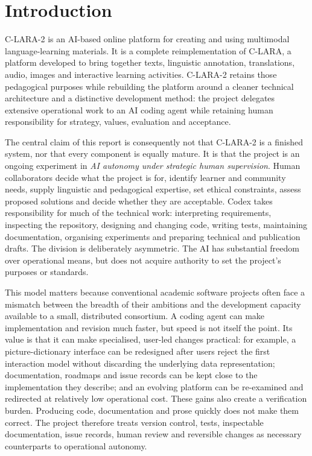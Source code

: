 \section{Introduction}

C-LARA-2 is an AI-based online platform for creating and using multimodal
language-learning materials. It is a complete reimplementation of C-LARA, a
platform developed to bring together texts, linguistic annotation,
translations, audio, images and interactive learning activities. C-LARA-2
retains those pedagogical purposes while rebuilding the platform around a
cleaner technical architecture and a distinctive development method: the
project delegates extensive operational work to an AI coding agent while
retaining human responsibility for strategy, values, evaluation and
acceptance.

The central claim of this report is consequently not that C-LARA-2 is a
finished system, nor that every component is equally mature. It is that the
project is an ongoing experiment in \emph{AI autonomy under strategic human
supervision}. Human collaborators decide what the project is for, identify
learner and community needs, supply linguistic and pedagogical expertise,
set ethical constraints, assess proposed solutions and decide whether they
are acceptable. Codex takes responsibility for much of the technical work:
interpreting requirements, inspecting the repository, designing and changing
code, writing tests, maintaining documentation, organising experiments and
preparing technical and publication drafts. The division is deliberately
asymmetric. The AI has substantial freedom over operational means, but does
not acquire authority to set the project's purposes or standards.

This model matters because conventional academic software projects often
face a mismatch between the breadth of their ambitions and the development
capacity available to a small, distributed consortium. A coding agent can
make implementation and revision much faster, but speed is not itself the
point. Its value is that it can make specialised, user-led changes practical:
for example, a picture-dictionary interface can be redesigned after users
reject the first interaction model without discarding the underlying data
representation; documentation, roadmaps and issue records can be kept close
to the implementation they describe; and an evolving platform can be
re-examined and redirected at relatively low operational cost. These gains
also create a verification burden. Producing code, documentation and prose
quickly does not make them correct. The project therefore treats version
control, tests, inspectable documentation, issue records, human review and
reversible changes as necessary counterparts to operational autonomy.

